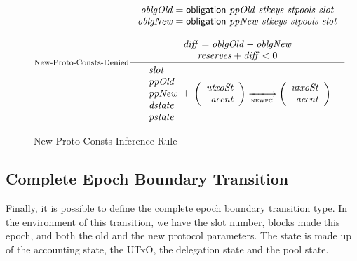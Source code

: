 \begin{figure}[htb]
  \nextdef

  \begin{equation}\label{eq:new-pc-denied}
    \inference[New-Proto-Consts-Denied]
    {
      \var{oblgOld} = \obligation{ppOld}{stkeys}{stpools}{slot} \\
      \var{oblgNew} = \obligation{ppNew}{stkeys}{stpools}{slot} \\
      ~\\
      \var{diff} = \var{oblgOld} - \var{oblgNew} \\
      \var{reserves} + \var{diff} < 0\\
    }
    {
      \begin{array}{l}
        \var{slot}\\
        \var{ppOld}\\
        \var{ppNew}\\
        \var{dstate}\\
        \var{pstate}\\
      \end{array}
      \vdash
      \left(
        \begin{array}{r}
          \var{utxoSt} \\
          \var{accnt}
        \end{array}
      \right)
      \trans{newpc}{}
      \left(
        \begin{array}{rcl}
          \var{utxoSt} \\
          \var{accnt}
        \end{array}
      \right)
    }
  \end{equation}
  \caption{New Proto Consts Inference Rule}
  \label{fig:rules:new-proto-consts}
\end{figure}

\subsection{Complete Epoch Boundary Transition}
\label{sec:total-epoch}

Finally, it is possible to define the complete epoch boundary transition type.
In the environment of this transition, we have the slot number, blocks made
this epoch, and both the old and the new protocol parameters. The state is
made up of the accounting state, the UTxO, the delegation state and the
pool state.

